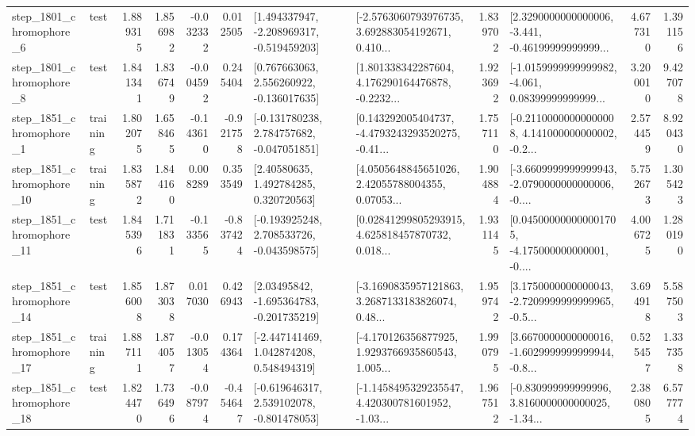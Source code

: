 \begin{tabular}{llrrrrllrlrr}
  step\_1801\_chromophore\_6 &      test &      1.889315 &    1.856982 &     -0.032332 &  0.012505 &   [1.494337947, -2.208969317, -0.519459203] &  [-2.5763060793976735, 3.692883054192671, 0.410... &       1.839702 &  [2.3290000000000006, -3.441, -0.46199999999999... &            4.677310 &          1.391156 \\
  step\_1801\_chromophore\_8 &      test &      1.841341 &    1.836749 &     -0.004592 &  0.245404 &    [0.767663063, 2.556260922, -0.136017635] &  [1.801338342287604, 4.176290164476878, -0.2232... &       1.923692 &  [-1.0159999999999982, -4.061, 0.08399999999999... &            3.200010 &          9.427078 \\
  step\_1851\_chromophore\_1 &  training &      1.802075 &    1.658465 &     -0.143610 & -0.921758 &   [-0.131780238, 2.784757682, -0.047051851] &  [0.143292005404737, -4.4793243293520275, -0.41... &       1.757110 &  [-0.21100000000000008, 4.141000000000002, -0.2... &            2.574459 &          8.920430 \\
 step\_1851\_chromophore\_10 &  training &      1.835872 &    1.844160 &      0.008289 &  0.353549 &      [2.40580635, 1.492784285, 0.320720563] &  [4.0505648845651026, 2.42055788004355, 0.07053... &       1.904884 &  [-3.6609999999999943, -2.0790000000000006, -0.... &            5.752673 &          1.305423 \\
 step\_1851\_chromophore\_11 &      test &      1.845396 &    1.711831 &     -0.133565 & -0.837424 &   [-0.193925248, 2.708533726, -0.043598575] &  [0.02841299805293915, 4.625818457870732, 0.018... &       1.931145 &  [0.045000000000001705, -4.175000000000001, -0.... &            4.006725 &          1.280190 \\
 step\_1851\_chromophore\_14 &      test &      1.856008 &    1.873038 &      0.017030 &  0.426943 &    [2.03495842, -1.695364783, -0.201735219] &  [-3.1690835957121863, 3.2687133183826074, 0.48... &       1.959742 &  [3.1750000000000043, -2.7209999999999965, -0.5... &            3.694918 &          5.587503 \\
 step\_1851\_chromophore\_17 &  training &      1.887111 &    1.874057 &     -0.013054 &  0.174364 &    [-2.447141469, 1.042874208, 0.548494319] &  [-4.170126356877925, 1.9293766935860543, 1.005... &       1.990795 &  [3.6670000000000016, -1.6029999999999944, -0.8... &            0.525457 &          1.337358 \\
 step\_1851\_chromophore\_18 &      test &      1.824470 &    1.736496 &     -0.087974 & -0.454647 &   [-0.619646317, 2.539102078, -0.801478053] &  [-1.1458495329235547, 4.420300781601952, -1.03... &       1.967512 &  [-0.830999999999996, 3.8160000000000025, -1.34... &            2.380805 &          6.577774 \\

\end{tabular}
